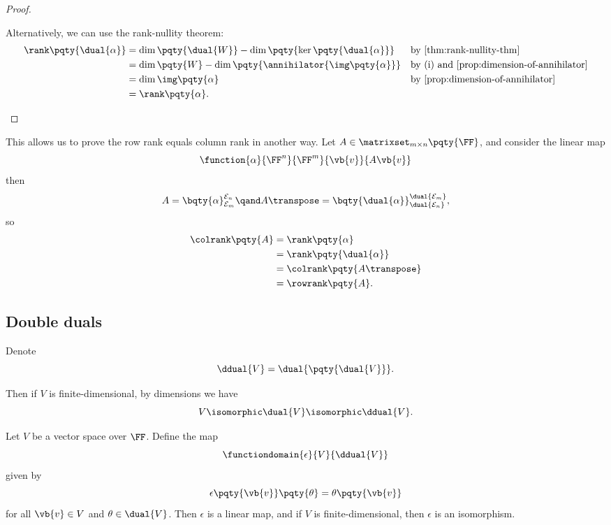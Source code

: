 \begin{proof}
\begin{enumerate}[label=(\roman*)]
        Alternatively, we can use the rank-nullity theorem:
        \begin{align*}
            \rank \pqty{\dual{\alpha}} &= \dim \pqty{\dual{W}} - \dim \pqty{\ker \pqty{\dual{\alpha}}} && \text{by \autoref{thm:rank-nullity-thm}} \\
            &= \dim \pqty{W} - \dim \pqty{\annihilator{\img\pqty{\alpha}}} && \text{by (i) and \autoref{prop:dimension-of-annihilator}} \\
            &= \dim \img \pqty{\alpha} && \text{by \autoref{prop:dimension-of-annihilator}} \\
            &= \rank \pqty{\alpha}.
        \end{align*}
    \end{enumerate}
\end{proof}

This allows us to prove the row rank equals column rank in another way. Let \(A \in \matrixset_{m \times n}\pqty{\FF}\), and consider the linear map
\[
    \function{\alpha}{\FF^n}{\FF^m}{\vb{v}}{A\vb{v}}
\]
then
\[
    A = \bqty{\alpha}_{\mathcal{E}_m}^{\mathcal{E}_n} \qand A\transpose = \bqty{\dual{\alpha}}_{\dual{\mathcal{E}_n}}^{\dual{\mathcal{E}_m}},
\]
so
\begin{align*}
    \colrank \pqty{A} &= \rank \pqty{\alpha} \\
    &= \rank \pqty{\dual{\alpha}} \\
    &= \colrank \pqty{A\transpose} \\
    &= \rowrank \pqty{A}.
\end{align*}

\subsection{Double duals}

Denote
\[
    \ddual{V} = \dual{\pqty{\dual{V}}}.
\]

Then if \(V\) is finite-dimensional, by dimensions we have
\[
    V \isomorphic \dual{V} \isomorphic \ddual{V}.
\]

\begin{theorem}
    Let \(V\) be a vector space over \(\FF\). Define the map
    \[
        \functiondomain{\epsilon}{V}{\ddual{V}}
    \]
    given by
    \[
        \epsilon\pqty{\vb{v}} \pqty{\theta} = \theta\pqty{\vb{v}}
    \]
    for all \(\vb{v} \in V\) and \(\theta \in \dual{V}\). Then \(\epsilon\) is a linear map, and if \(V\) is finite-dimensional, then \(\epsilon\) is an isomorphism.
\end{theorem}

